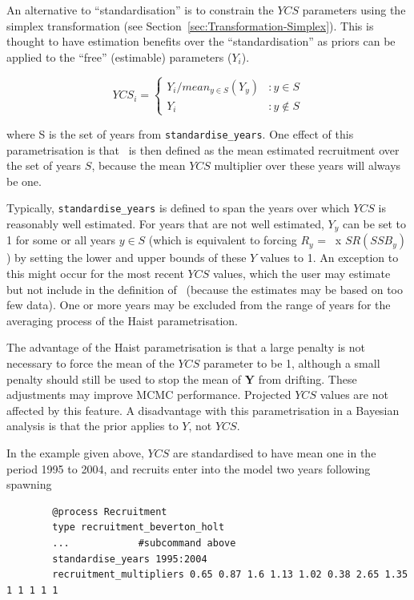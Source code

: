 An alternative to \enquote{standardisation} is to constrain the $YCS$ parameters using the simplex transformation (see Section~\ref{sec:Transformation-Simplex}). This is thought to have estimation benefits over the \enquote{standardisation} as priors can be applied to the \enquote{free} (estimable) parameters (\(Y_i\)).

\[
YCS_i =
\begin{cases}
Y_i / mean_{y \in S}(Y_y) & :y \in S\\
Y_i					 & :y \notin S
\end{cases}
\]

where S is the set of years from \texttt{standardise\_years}. One effect of this parametrisation is that \Rzero\ is then defined as the mean estimated recruitment over the set of years $S$, because the mean $YCS$ multiplier over these years will always be one.

Typically, \texttt{standardise\_years} is defined to span the years over which $YCS$ is reasonably well estimated. For years that are not well estimated, $Y_y$ can be set to 1 for some or all years $y\in S$ (which is equivalent to forcing $R_y$ = \Rzero\ x $SR(SSB_y)$) by setting the lower and upper bounds of these $Y$ values to 1. An exception to this might occur for the most recent $YCS$ values, which the user may estimate but not include in the definition of \Rzero\ (because the estimates may be based on too few data). One or more years may be excluded from the range of years for the averaging process of the Haist parametrisation.

The advantage of the Haist parametrisation is that a large penalty is not necessary to force the mean of the $YCS$ parameter to be 1, although a small penalty should still be used to stop the mean of \textbf{Y} from drifting. These adjustments may improve MCMC performance. Projected $YCS$ values are not affected by this feature. A disadvantage with this parametrisation in a Bayesian analysis is that the prior applies to $Y$, not $YCS$.

In the  example given above, $YCS$ are standardised to have mean one in the period 1995 to 2004, and recruits enter into the model two years following spawning

{\small{\begin{verbatim}
		@process Recruitment
		type recruitment_beverton_holt
		...            #subcommand above
		standardise_years 1995:2004
		recruitment_multipliers 0.65 0.87 1.6 1.13 1.02 0.38 2.65 1.35 1 1 1 1 1
		\end{verbatim}}}


